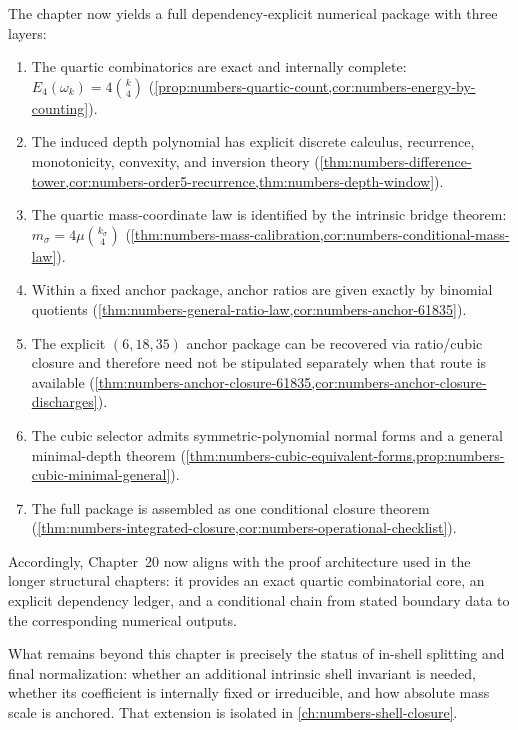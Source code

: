 The chapter now yields a full dependency-explicit numerical package with
three layers:
\begin{enumerate}[label=\textup{(\roman*)}]
\item The quartic combinatorics are exact and internally complete:
      \(E_4(\omega_k)=4\binom{k}{4}\)
      (\cref{prop:numbers-quartic-count,cor:numbers-energy-by-counting}).
\item The induced depth polynomial has explicit discrete calculus,
      recurrence, monotonicity, convexity, and inversion theory
      (\cref{thm:numbers-difference-tower,cor:numbers-order5-recurrence,thm:numbers-depth-window}).
\item The quartic mass-coordinate law is identified by the intrinsic bridge theorem:
      \(m_\sigma=4\mu\binom{k_\sigma}{4}\)
      (\cref{thm:numbers-mass-calibration,cor:numbers-conditional-mass-law}).
\item Within a fixed anchor package, anchor ratios are given exactly
      by binomial quotients
      (\cref{thm:numbers-general-ratio-law,cor:numbers-anchor-61835}).
\item The explicit \((6,18,35)\) anchor package can be recovered via
      ratio/cubic closure and therefore need not be stipulated separately
      when that route is available
      (\cref{thm:numbers-anchor-closure-61835,cor:numbers-anchor-closure-discharges}).
\item The cubic selector admits symmetric-polynomial normal forms and a
      general minimal-depth theorem
      (\cref{thm:numbers-cubic-equivalent-forms,prop:numbers-cubic-minimal-general}).
\item The full package is assembled as one conditional closure theorem
      (\cref{thm:numbers-integrated-closure,cor:numbers-operational-checklist}).
\end{enumerate}

Accordingly, Chapter~20 now aligns with the proof architecture used in the
longer structural chapters:
it provides an exact quartic combinatorial core,
an explicit dependency ledger,
and a conditional chain from stated boundary data to the corresponding
numerical outputs.

What remains beyond this chapter is precisely the status of
in-shell splitting and final normalization: whether an additional
intrinsic shell invariant is needed, whether its coefficient is
internally fixed or irreducible, and how absolute mass scale is anchored.
That extension is isolated in \cref{ch:numbers-shell-closure}.

\begin{chapterclosing}
\end{chapterclosing}
